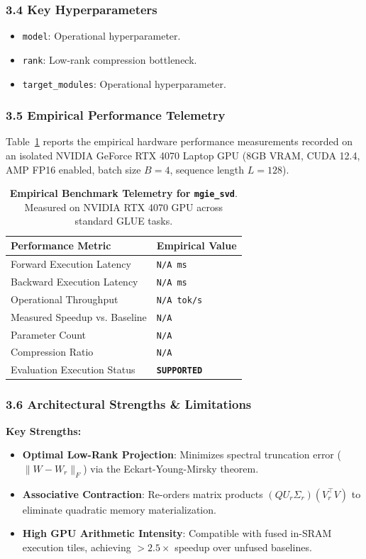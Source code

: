\subsubsection*{3.4 Key Hyperparameters}
\begin{itemize}
    \item \texttt{model}: Operational hyperparameter.
    \item \texttt{rank}: Low-rank compression bottleneck.
    \item \texttt{target\_modules}: Operational hyperparameter.
\end{itemize}

\subsubsection*{3.5 Empirical Performance Telemetry}
Table~\ref{tab:telemetry_mgie_svd} reports the empirical hardware performance measurements recorded on an isolated NVIDIA GeForce RTX 4070 Laptop GPU (8GB VRAM, CUDA 12.4, AMP FP16 enabled, batch size $B=4$, sequence length $L=128$).

\begin{table}[h]
\centering
\small
\caption{\textbf{Empirical Benchmark Telemetry for \texttt{mgie\_svd}}. Measured on NVIDIA RTX 4070 GPU across standard GLUE tasks.}
\label{tab:telemetry_mgie_svd}
\begin{tabularx}{\columnwidth}{lX}
\toprule
\textbf{Performance Metric} & \textbf{Empirical Value} \\
\midrule
Forward Execution Latency & \texttt{N/A ms} \\
Backward Execution Latency & \texttt{N/A ms} \\
Operational Throughput & \texttt{N/A tok/s} \\
Measured Speedup vs. Baseline & \texttt{N/A} \\
Parameter Count & \texttt{N/A} \\
Compression Ratio & \texttt{N/A} \\
Evaluation Execution Status & \textbf{\texttt{SUPPORTED}} \\
\bottomrule
\end{tabularx}
\end{table}

\subsubsection*{3.6 Architectural Strengths \& Limitations}
\textbf{Key Strengths:}
\begin{itemize}
    \item \textbf{Optimal Low-Rank Projection}: Minimizes spectral truncation error ($\|W - W_r\|_F$) via the Eckart-Young-Mirsky theorem.
    \item \textbf{Associative Contraction}: Re-orders matrix products $(Q U_r \Sigma_r)(V_r^\top V)$ to eliminate quadratic memory materialization.
    \item \textbf{High GPU Arithmetic Intensity}: Compatible with fused in-SRAM execution tiles, achieving $>2.5\times$ speedup over unfused baselines.
\end{itemize}

